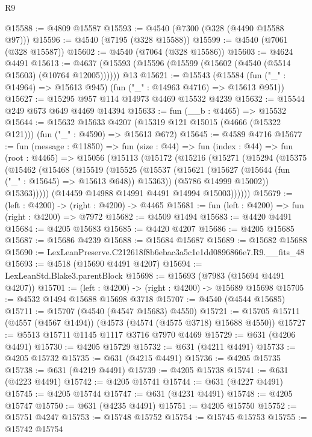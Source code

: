 \begin{lexlean}{R9}
\begin{coremodule}
@15588 := @4809 @15587
@15593 := @4540 (@7300 (@328 (@4490 @15588 @97)))
@15596 := @4540 (@7195 (@328 @15588))
@15599 := @4540 (@7061 (@328 @15587))
@15602 := @4540 (@7064 (@328 @15586))
@15603 := @4624 @4491
@15613 := @4637 (@15593 (@15596 (@15599 (@15602 (@4540 (@5514 @15603) (@10764 @12005)))))) @13
@15621 := @15543
    (@15584 (fun ("_" : @14964) => @15613 @945) (fun ("_" : @14963 @4716) => @15613 @951))
@15627 := @15295 @957 @114 @14973 @4469 @15532 @4239
@15632 := @15544 @249 @673 @649 @4469 @14394
@15633 := fun (__b : @4465) => @15532
@15644 := @15632
    @15633
    @4207
    (@15319 @121 @15015 (@4666 (@15322 @121)))
    (fun ("_" : @4590) => @15613 @672)
@15645 := @4589 @4716
@15677 := fun (message : @11850) =>
  fun (size : @44) =>
  fun (index : @44) =>
  fun (root : @4465) =>
  @15056
    (@15113
      (@15172
        (@15216
          (@15271
            (@15294
              (@15375
                (@15462
                  (@15468
                    (@15519
                      (@15525
                        (@15537
                          (@15621 (@15627 (@15644 (fun ("_" : @15645) => @15613 @648)) @15363))
                          (@5786 @14999 @15002))
                        @15363)))))
              (@14459 @14988 @14991 @4491 @14994 @15003))))))
@15679 := (left : @4200) -> (right : @4200) -> @4465
@15681 := fun (left : @4200) => fun (right : @4200) => @7972
@15682 := @4509 @1494
@15683 := @4420 @4491
@15684 := @4205 @15683
@15685 := @4420 @4207
@15686 := @4205 @15685
@15687 := @15686 @4239
@15688 := @15684 @15687
@15689 := @15682 @15688
@15690 := LexLeanPreserve.C212618f8b6ebac3a5c1e1dd0896866e7.R9.__fits_48
@15693 := @4518 (@15690 @4491 @4207)
@15694 := LexLeanStd.Blake3.parentBlock
@15698 := @15693 (@7983 (@15694 @4491 @4207))
@15701 := (left : @4200) -> (right : @4200) -> @15689 @15698
@15705 := @4532 @1494 @15688 @15698 @3718
@15707 := @4540 (@4544 @15685)
@15711 := @15707 (@4540 (@4547 @15683) @4550)
@15721 := @15705 @15711 (@4557 (@4567 @1494)) (@4573 (@4574 (@4575 @3718) @15688 @4550))
@15727 := @5513 @15711 @1145 @1117 @3716 @7970 @4469
@15729 := @631 (@4206 @4491)
@15730 := @4205 @15729
@15732 := @631 (@4211 @4491)
@15733 := @4205 @15732
@15735 := @631 (@4215 @4491)
@15736 := @4205 @15735
@15738 := @631 (@4219 @4491)
@15739 := @4205 @15738
@15741 := @631 (@4223 @4491)
@15742 := @4205 @15741
@15744 := @631 (@4227 @4491)
@15745 := @4205 @15744
@15747 := @631 (@4231 @4491)
@15748 := @4205 @15747
@15750 := @631 (@4235 @4491)
@15751 := @4205 @15750
@15752 := @15751 @4247
@15753 := @15748 @15752
@15754 := @15745 @15753
@15755 := @15742 @15754

\end{coremodule}
\end{lexlean}
